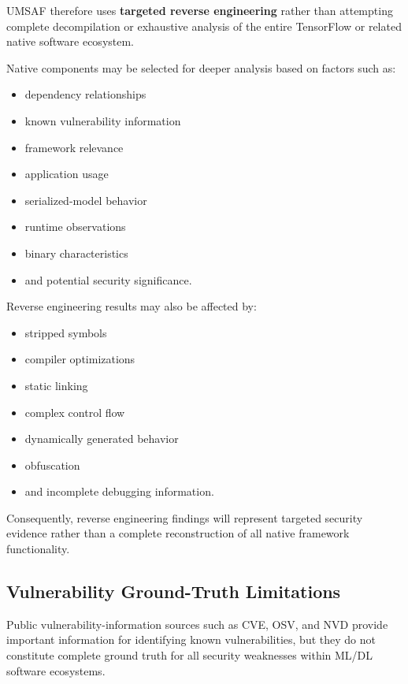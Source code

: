 \documentclass[
  12pt,
  letterpaper,
  oneside]{report}
\providecommand{\tightlist}{%
  \setlength{\itemsep}{0pt}\setlength{\parskip}{0pt}}
\begin{document}
UMSAF therefore uses \textbf{targeted reverse engineering} rather than
attempting complete decompilation or exhaustive analysis of the entire
TensorFlow or related native software ecosystem.

Native components may be selected for deeper analysis based on factors
such as:

\begin{itemize}
\tightlist
\item
  dependency relationships
\item
  known vulnerability information
\item
  framework relevance
\item
  application usage
\item
  serialized-model behavior
\item
  runtime observations
\item
  binary characteristics
\item
  and potential security significance.
\end{itemize}

Reverse engineering results may also be affected by:

\begin{itemize}
\tightlist
\item
  stripped symbols
\item
  compiler optimizations
\item
  static linking
\item
  complex control flow
\item
  dynamically generated behavior
\item
  obfuscation
\item
  and incomplete debugging information.
\end{itemize}

Consequently, reverse engineering findings will represent targeted
security evidence rather than a complete reconstruction of all native
framework functionality.

\subsection{Vulnerability Ground-Truth Limitations}\label{1314-vulnerability-ground-truth-limitations}

Public vulnerability-information sources such as CVE, OSV, and NVD
provide important information for identifying known vulnerabilities, but
they do not constitute complete ground truth for all security weaknesses
within ML/DL software ecosystems.
\end{document}
